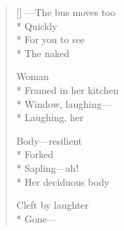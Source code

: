 \label{ch:there}
\begin{verse}[\versewidth]
\hspace*{2\vgap} ---The bus moves too\\*
Quickly\\*
For you to see\\*
The naked

Woman\\*
Framed in her kitchen\\*
Window, laughing---\\*
Laughing, her

Body---resilient\\*
Forked\\*
Sapling---ah!\\*
Her deciduous body

Cleft by laughter\\*
Gone---
\end{verse}

